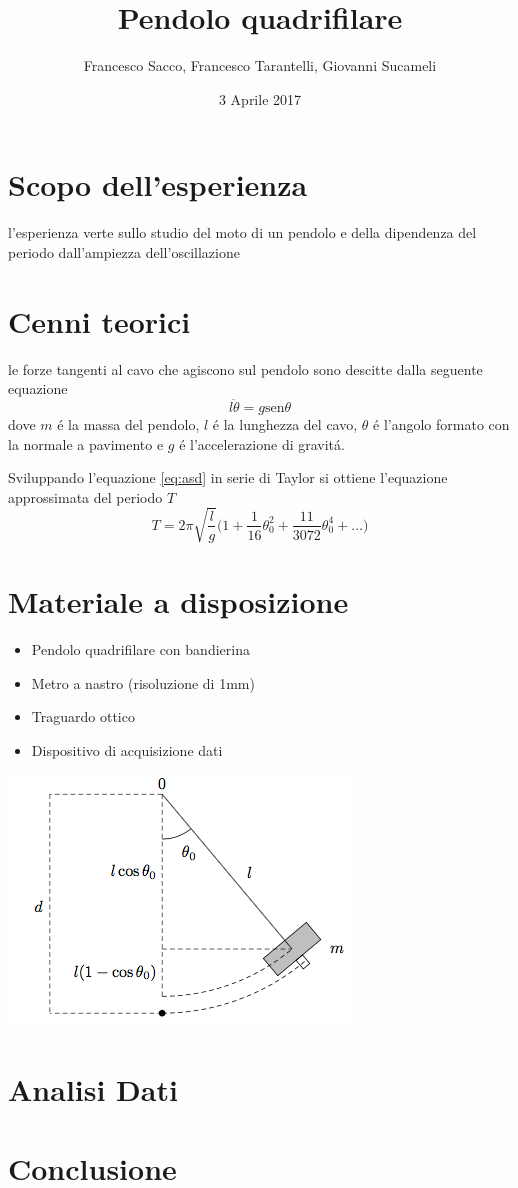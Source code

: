 \documentclass{exam}
\date{3 Aprile 2017}
\title{Pendolo quadrifilare}
\author{Francesco Sacco, Francesco Tarantelli, Giovanni Sucameli}
\begin{document}
	\maketitle
	\section{Scopo dell'esperienza}
		l'esperienza verte sullo studio del moto di un pendolo e della dipendenza del periodo dall'ampiezza dell'oscillazione
	\section{Cenni teorici}
		le forze tangenti al cavo che agiscono sul pendolo sono descitte dalla seguente equazione
		\begin{equation}
			l\ddot{\theta}=g\textrm{sen}\theta \label{eq:asd}
		\end{equation}
		dove $m$ \'e la massa del pendolo, $l$ \'e la lunghezza del cavo, $\theta$ \'e l'angolo formato con la normale a pavimento e $g$ \'e l'accelerazione di gravit\'a.\par
		Sviluppando l'equazione \ref{eq:asd} in serie di Taylor si ottiene l'equazione approssimata del periodo $T$
		\begin{equation}
			T=2\pi\sqrt{\frac{l}{g}}\bigg(1+\frac{1}{16}\theta_{0}^2+\frac{11}{3072}\theta_{0}^4+\dots\bigg)
		\end{equation}
	\section{Materiale a disposizione}
		\begin{itemize}
			\item Pendolo quadrifilare con bandierina
			\item Metro a nastro (risoluzione di 1mm)
			\item Traguardo ottico
			\item Dispositivo di acquisizione dati
		\end{itemize}
		\includegraphics[scale=0.5]{schema_pendolo}
	\newpage
	\section{Analisi Dati}
	\section{Conclusione}
\end{document}
